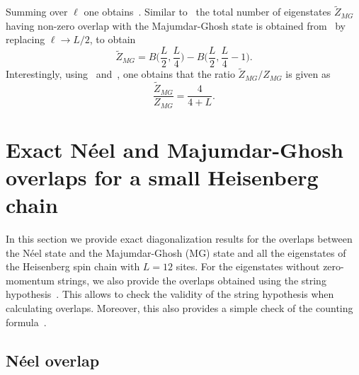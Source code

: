 \documentclass[11pt]{iopart}
\begin{document}
%
Summing over $\ell$ one obtains~. Similar to~ the total number 
of eigenstates $\widetilde Z_{MG}$ having non-zero overlap with the Majumdar-Ghosh state 
is obtained from~ by replacing $\ell\to L/2$, to obtain 
%
\begin{equation}
\label{mg-fi}
\widetilde Z_{MG}=B\Big(\frac{L}{2},\frac{L}{4}\Big)-B\Big(\frac{L}{2},\frac{L}{4}-1
\Big). 
\end{equation}
%
Interestingly, using~ and~, one obtains that the ratio 
$\widetilde Z_{MG}/Z_{MG}$ is given as 
%
\begin{equation}
\frac{\widetilde Z_{MG}}{Z_{MG}}=\frac{4}{4+L}. 
\end{equation}
%


\section{Exact N\'eel and Majumdar-Ghosh overlaps for a small Heisenberg chain} 
\label{app-L12}

In this section we provide exact diagonalization results for the overlaps between the 
N\'eel state and the Majumdar-Ghosh (MG) state and all the eigenstates of the Heisenberg 
spin chain with $L=12$ sites. For the eigenstates without zero-momentum strings, we 
also provide the overlaps obtained using the string hypothesis~. 
This allows to check the validity of the string hypothesis when calculating overlaps. 
Moreover, this also provides a simple check of the counting formula~. 

\subsection{N\'eel overlap}
\label{app-Neel}
\end{document}
